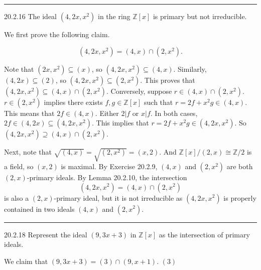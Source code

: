 \documentclass[letterpaper, 12pt]{article}
\begin{document}
\noindent\rule{7in}{2.8pt}
\begin{problem}{20.2.16}
The ideal \((4,2x,x^2)\) in the ring \(\mathbb{Z}[x]\) is primary but not irreducible.
\end{problem}
\begin{solution}
We first prove the following claim.
\begin{claim}
\[(4,2x,x^2)=(4,x)\cap (2,x^2).\]
\end{claim}
\begin{claimproof}
Note that \((2x,x^2)\subseteq (x)\), so \((4,2x,x^2)\subseteq (4,x)\). Similarly, \((4,2x)\subseteq (2)\), so \((4,2x,x^2)\subseteq (2,x^2)\). This proves that \((4,2x,x^2)\subseteq (4,x)\cap (2,x^2)\). Conversely, suppose \(r\in (4,x)\cap (2,x^2)\). \(r\in (2,x^2)\) implies there exists \(f,g\in \mathbb{Z}[x]\) such that \(r=2f+x^2g\in (4,x)\). This means that \(2f\in (4,x)\). Either \(2|f\) or \(x|f\). In both cases, \(2f\in (4,2x)\subseteq (4,2x,x^2)\). This implies that \(r=2f+x^2g\in (4,2x,x^2)\). So \((4,2x,x^2)\supseteq (4,x)\cap (2,x^2)\).
\end{claimproof}

Next, note that \(\sqrt{(4,x)}=\sqrt{(2,x^2)}=(x,2)\). And \(\mathbb{Z}[x]/(2,x)\cong \mathbb{Z}/2\) is a field, so \((x,2)\) is maximal. By Exercise 20.2.9, \((4,x)\) and \((2,x^2)\) are both \((2,x)\)-primary ideals. By Lemma 20.2.10, the intersection 
\[(4,2x,x^2)=(4,x)\cap (2,x^2)\]
is also a \((2,x)\)-primary ideal, but it is not irreducible as \((4,2x,x^2)\) is properly contained in two ideals \((4,x)\) and \((2,x^2)\). 
\end{solution}

\noindent\rule{7in}{2.8pt}
\begin{problem}{20.2.18}
Represent the ideal \((9,3x+3)\) in \(\mathbb{Z}[x]\) as the intersection of primary ideals.
\end{problem}
\begin{solution}
We claim that \((9,3x+3)=(3)\cap (9,x+1)\). \((3)\) 
\end{solution}
\end{document}
